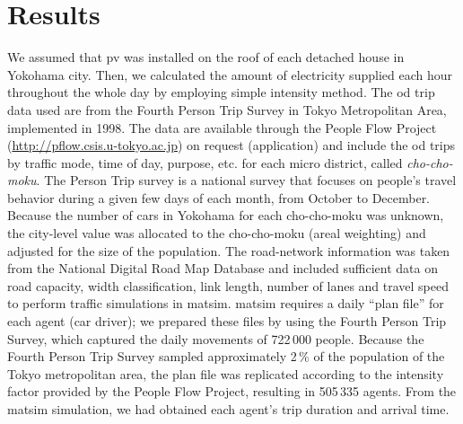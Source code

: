 \section{Results}
We assumed that \gls{pv} was installed on the roof of each detached house in Yokohama city. Then, we calculated the amount of electricity supplied each hour throughout the whole day by employing simple intensity method. 
The \gls{od} trip data used are from the Fourth Person Trip Survey in Tokyo Metropolitan Area, implemented in 1998. The data are available through the People Flow Project (\url{http://pflow.csis.u-tokyo.ac.jp}) on request (application) and include the \gls{od} trips by traffic mode, time of day, purpose, etc. for each micro district, called \emph{cho-cho-moku}. The Person Trip survey is a national survey that focuses on people's travel behavior during a given few days of each month, from October to December. Because the number of cars in Yokohama for each cho-cho-moku was unknown, the city-level value was allocated to the cho-cho-moku (areal weighting) and adjusted for the size of the population. The road-network information was taken from the National Digital Road Map Database and included sufficient data on road capacity, width classification, link length, number of lanes and travel speed to perform traffic simulations in \gls{matsim}. \gls{matsim} requires a daily ``plan file'' for each agent (car driver); we prepared these files by using the Fourth Person Trip Survey, which captured the daily movements of 722\,000 people. Because the Fourth Person Trip Survey sampled approximately 2\,\% of the population of the Tokyo metropolitan area, the plan file was replicated according to the intensity factor provided by the People Flow Project, resulting in 505\,335 agents. From the \gls{matsim} simulation, we had obtained each agent's trip duration and arrival time. 

